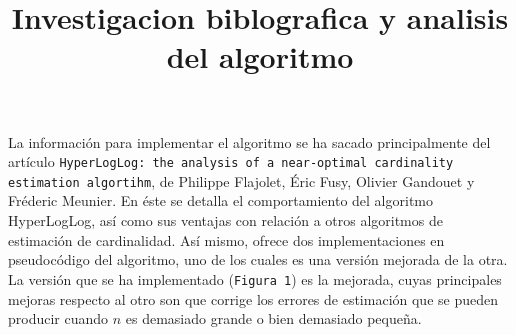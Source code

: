 \documentclass[11pt]{article}
\begin{document}
\title{Investigacion biblografica y analisis del algoritmo}
\maketitle

La información para implementar el algoritmo se ha sacado principalmente del artículo \texttt{HyperLogLog: the analysis of a near-optimal cardinality estimation algortihm}, de Philippe Flajolet, Éric Fusy, Olivier Gandouet y Fréderic Meunier. En éste se detalla el comportamiento del algoritmo HyperLogLog, así como sus ventajas con relación a otros algoritmos de estimación de cardinalidad. Así mismo, ofrece dos implementaciones en pseudocódigo del algoritmo, uno de los cuales es una versión mejorada de la otra. La versión que se ha implementado (\texttt{Figura 1}) es la mejorada, cuyas principales mejoras respecto al otro son que corrige los errores de estimación que se pueden producir cuando $n$ es demasiado grande o bien demasiado pequeña.
\end{document}
